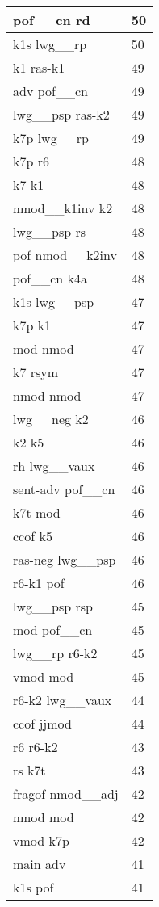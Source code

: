 \documentclass[a4 paper]{article}
\begin{document}
\begin{longtable}{p{}p{}}
pof\_\_cn rd  & 50 \\ \midrule
k1s lwg\_\_rp  & 50 \\ \midrule
k1 ras-k1  & 49 \\ \midrule
adv pof\_\_cn  & 49 \\ \midrule
lwg\_\_psp ras-k2  & 49 \\ \midrule
k7p lwg\_\_rp  & 49 \\ \midrule
k7p r6  & 48 \\ \midrule
k7 k1  & 48 \\ \midrule
nmod\_\_k1inv k2  & 48 \\ \midrule
lwg\_\_psp rs  & 48 \\ \midrule
pof nmod\_\_k2inv  & 48 \\ \midrule
pof\_\_cn k4a  & 48 \\ \midrule
k1s lwg\_\_psp  & 47 \\ \midrule
k7p k1  & 47 \\ \midrule
mod nmod  & 47 \\ \midrule
k7 rsym  & 47 \\ \midrule
nmod nmod  & 47 \\ \midrule
lwg\_\_neg k2  & 46 \\ \midrule
k2 k5  & 46 \\ \midrule
rh lwg\_\_vaux  & 46 \\ \midrule
sent-adv pof\_\_cn  & 46 \\ \midrule
k7t mod  & 46 \\ \midrule
ccof k5  & 46 \\ \midrule
ras-neg lwg\_\_psp  & 46 \\ \midrule
r6-k1 pof  & 46 \\ \midrule
lwg\_\_psp rsp  & 45 \\ \midrule
mod pof\_\_cn  & 45 \\ \midrule
lwg\_\_rp r6-k2  & 45 \\ \midrule
vmod mod  & 45 \\ \midrule
r6-k2 lwg\_\_vaux  & 44 \\ \midrule
ccof jjmod  & 44 \\ \midrule
r6 r6-k2  & 43 \\ \midrule
rs k7t  & 43 \\ \midrule
fragof nmod\_\_adj  & 42 \\ \midrule
nmod mod  & 42 \\ \midrule
vmod k7p  & 42 \\ \midrule
main adv  & 41 \\ \midrule
k1s pof  & 41 \\ \midrule

\end{longtable}
\end{document}
